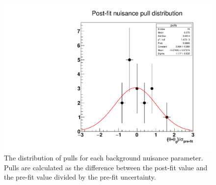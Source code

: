 \begin{figure}[hbtp]
\centering
\includegraphics[scale=0.3]{figures/results/nuisancePulls.pdf}
\caption{The distribution of pulls for each background nuisance parameter. Pulls are calculated as the difference between the post-fit value and the pre-fit value divided by the pre-fit uncertainty.}
\label{pre_postfit_param_pulls}
\end{figure}